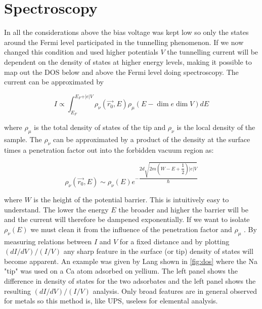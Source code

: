 \section{Spectroscopy}
In all the considerations above the bias voltage was kept low so only the states around the Fermi level participated in the tunnelling phenomenon. If we now changed this condition and used higher potentials $V$ the tunnelling current will be dependent on the density of states at higher energy levels, making it possible to map out the DOS below and above the Fermi level doing spectroscopy. The current can be approximated by

\begin{equation}
I\propto\int_{E_F}^{E_F+\vert e\vert V}\rho_{\nu}(\vec{r_0},E)\rho_{\mu}(E-\dim e\dim V)dE
\end{equation}

\noindent where $\rho_{\mu}$ is the total density of states of the tip and $\rho_{\nu}$ is the local density of the sample. The $\rho_{\nu}$ can  be approximated by a product of the density at the surface times a penetration factor out into the forbidden vacuum region as:

\begin{equation}
\rho_{\nu}(\vec{r_0},E)\sim\rho_{\nu}(E)e^{-\dfrac{2d\sqrt{2m(W-E+\dfrac{1}{2})\vert e\vert V}}{\hbar}}
\end{equation}

\noindent where $W$ is the height of the potential barrier. This is intuitively easy to understand. The lower the energy $E$ the broader and higher the barrier will be and the current will therefore be dampened exponentially. If we want to isolate $\rho_{\nu}(E)$ we must clean it from the influence of the penetration factor and $\rho_{\mu}$ . By measuring relations between $I$ and $V$ for a fixed distance and by plotting  $(dI/dV)/(I/V)$ any sharp feature in the surface (or tip) density of states will become apparent. An example was given by Lang shown in \autoref{fig:dos} where the Na "tip" was used on a Ca atom adsorbed on yellium. The left panel shows the difference in density of states for the two adsorbates and the left panel shows the resulting $(dI/dV)/(I/V)$ analysis. Only broad features are in general observed for metals so this method is, like UPS, useless for elemental analysis.

